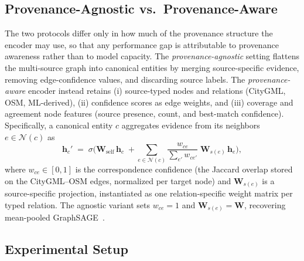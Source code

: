 \documentclass[sigconf,authordraft]{acmart}
\begin{document}


\subsection{Provenance-Agnostic vs.\ Provenance-Aware}
\label{sec:repL:prov}
The two protocols differ only in how much of the provenance structure the encoder may use, so that any performance gap is attributable to provenance awareness rather than to model capacity. The \emph{provenance-agnostic} setting flattens the multi-source graph into canonical entities by merging source-specific evidence, removing edge-confidence values, and discarding source labels. The \emph{provenance-aware} encoder instead retains (i) source-typed nodes and relations (CityGML, OSM, ML-derived), (ii) confidence scores as edge weights, and (iii) coverage and agreement node features (source presence, count, and best-match confidence). Specifically, a canonical entity $c$ aggregates evidence from its neighbors $e\in\mathcal N(c)$ as
\begin{equation}
\mathbf h_c' \;=\; \sigma\Big(\mathbf W_{\text{self}}\,\mathbf h_c
\;+\!\!\sum_{e\in\mathcal N(c)}\!\frac{w_{ce}}{\textstyle\sum_{e'} w_{ce'}}\;
\mathbf W_{s(e)}\,\mathbf h_e\Big),
\label{eq:confagg}
\end{equation}
where $w_{ce}\in[0,1]$ is the correspondence confidence (the Jaccard overlap stored on the CityGML--OSM edges, normalized per target node) and $\mathbf W_{s(e)}$ is a source-specific projection, instantiated as one relation-specific weight matrix per typed relation. The agnostic variant sets $w_{ce}=1$ and $\mathbf W_{s(e)}=\mathbf W$, recovering mean-pooled GraphSAGE~\citep{hamilton2017graphsage}.

\subsection{Experimental Setup}
\label{sec:repL:setup}
\end{document}
